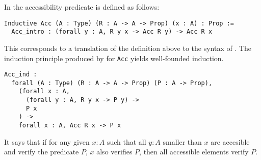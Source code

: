 In \Coq the accessibility predicate is defined as follows:
\begin{verbatim}
Inductive Acc (A : Type) (R : A -> A -> Prop) (x : A) : Prop :=
  Acc_intro : (forall y : A, R y x -> Acc R y) -> Acc R x
\end{verbatim}
This corresponds to a translation of the definition above to the syntax of \Coq.
The induction principle produced by \Coq for \texttt{Acc} yields
well-founded induction.
\begin{verbatim}
Acc_ind :
  forall (A : Type) (R : A -> A -> Prop) (P : A -> Prop),
    (forall x : A,
      (forall y : A, R y x -> P y) ->
      P x
    ) ->
    forall x : A, Acc R x -> P x
\end{verbatim}
It says that if for any given \(x : A\) such that all \(y : A\) smaller than
\(x\) are accesible and verify the predicate \(P\), \(x\) also verifies \(P\),
then all accessible elements verify \(P\).

